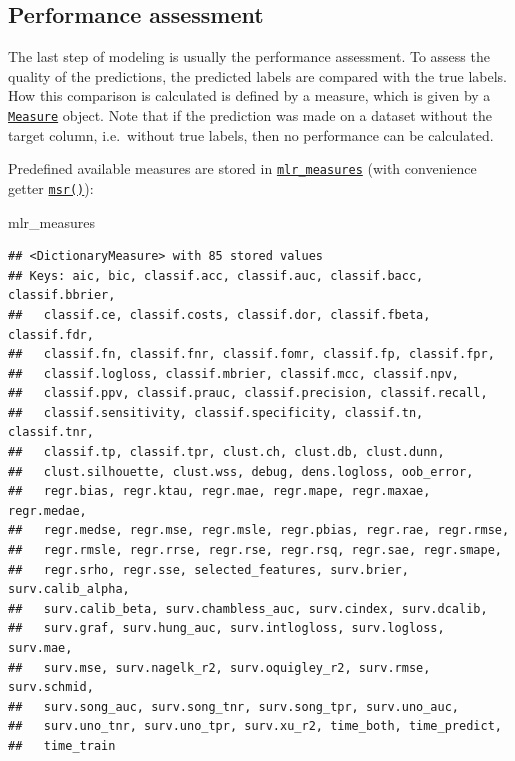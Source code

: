 \documentclass[
]{scrbook}
\newenvironment{Shaded}{\begin{snugshade}}{\end{snugshade}}
\newcommand{\NormalTok}[1]{#1}
\renewenvironment{Shaded} {\begin{snugshade}\small} {\end{snugshade}}
\begin{document}
\hypertarget{measure}{%
\subsection{Performance assessment}\label{measure}}

The last step of modeling is usually the performance assessment.
To assess the quality of the predictions, the predicted labels are compared with the true labels.
How this comparison is calculated is defined by a measure, which is given by a \href{https://mlr3.mlr-org.com/reference/Measure.html}{\texttt{Measure}} object.
Note that if the prediction was made on a dataset without the target column, i.e.~without true labels, then no performance can be calculated.

Predefined available measures are stored in \href{https://mlr3.mlr-org.com/reference/mlr_measures.html}{\texttt{mlr\_measures}} (with convenience getter \href{https://mlr3.mlr-org.com/reference/mlr_sugar.html}{\texttt{msr()}}):

\begin{Shaded}
\begin{Highlighting}[]
\NormalTok{mlr\_measures}
\end{Highlighting}
\end{Shaded}

\begin{verbatim}
## <DictionaryMeasure> with 85 stored values
## Keys: aic, bic, classif.acc, classif.auc, classif.bacc, classif.bbrier,
##   classif.ce, classif.costs, classif.dor, classif.fbeta, classif.fdr,
##   classif.fn, classif.fnr, classif.fomr, classif.fp, classif.fpr,
##   classif.logloss, classif.mbrier, classif.mcc, classif.npv,
##   classif.ppv, classif.prauc, classif.precision, classif.recall,
##   classif.sensitivity, classif.specificity, classif.tn, classif.tnr,
##   classif.tp, classif.tpr, clust.ch, clust.db, clust.dunn,
##   clust.silhouette, clust.wss, debug, dens.logloss, oob_error,
##   regr.bias, regr.ktau, regr.mae, regr.mape, regr.maxae, regr.medae,
##   regr.medse, regr.mse, regr.msle, regr.pbias, regr.rae, regr.rmse,
##   regr.rmsle, regr.rrse, regr.rse, regr.rsq, regr.sae, regr.smape,
##   regr.srho, regr.sse, selected_features, surv.brier, surv.calib_alpha,
##   surv.calib_beta, surv.chambless_auc, surv.cindex, surv.dcalib,
##   surv.graf, surv.hung_auc, surv.intlogloss, surv.logloss, surv.mae,
##   surv.mse, surv.nagelk_r2, surv.oquigley_r2, surv.rmse, surv.schmid,
##   surv.song_auc, surv.song_tnr, surv.song_tpr, surv.uno_auc,
##   surv.uno_tnr, surv.uno_tpr, surv.xu_r2, time_both, time_predict,
##   time_train
\end{verbatim}
\end{document}
